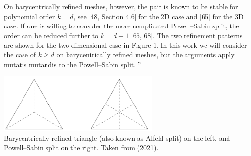 On barycentrically refined meshes, however, the pair is known to be stable for polynomial order
$k = d$, see [48, Section 4.6] for the 2D case and [65] for the 3D case. If one is willing to 
consider the more complicated Powell–Sabin split, the order can be reduced further to 
$k = d-1$ [66, 68]. The two
refinement patterns are shown for the two dimensional case in Figure 1. In this work we will consider
the case of $k \ge d$ on barycentrically refined meshes, but the arguments apply mutatis mutandis to the
Powell–Sabin split.
''

\begin{center}
\includegraphics[width=8cm]{images/pair_scott_vogelius/scottvogelius_split}\\
{\captionfont 
Barycentrically refined triangle (also known as Alfeld split) on the left,
and Powell–Sabin split on the right. Taken from \textcite{fams21} (2021).}
\end{center}

